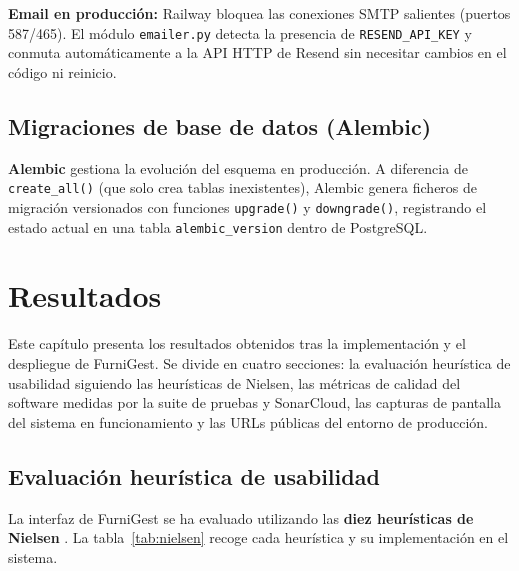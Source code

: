 \documentclass[12pt,twoside,titlepage]{report}
\begin{document}
\textbf{Email en producción:} Railway bloquea las conexiones SMTP salientes (puertos 587/465). El módulo \texttt{emailer.py} detecta la presencia de \texttt{RESEND\_API\_KEY} y conmuta automáticamente a la API HTTP de Resend \cite{resend} sin necesitar cambios en el código ni reinicio.


\section{Migraciones de base de datos (Alembic)}

\textbf{Alembic} \cite{alembic} gestiona la evolución del esquema en producción. A diferencia de \texttt{create\_all()} (que solo crea tablas inexistentes), Alembic genera ficheros de migración versionados con funciones \texttt{upgrade()} y \texttt{downgrade()}, registrando el estado actual en una tabla \texttt{alembic\_version} dentro de PostgreSQL.



%
%
\chapter{Resultados}
\label{chap:resultados}

Este capítulo presenta los resultados obtenidos tras la implementación y el despliegue de FurniGest. Se divide en cuatro secciones: la evaluación heurística de usabilidad siguiendo las heurísticas de Nielsen, las métricas de calidad del software medidas por la suite de pruebas y SonarCloud, las capturas de pantalla del sistema en funcionamiento y las URLs públicas del entorno de producción.

\section{Evaluación heurística de usabilidad}

La interfaz de FurniGest se ha evaluado utilizando las \textbf{diez heurísticas de Nielsen} \cite{nielsen}. La tabla~\ref{tab:nielsen} recoge cada heurística y su implementación en el sistema.
\end{document}
